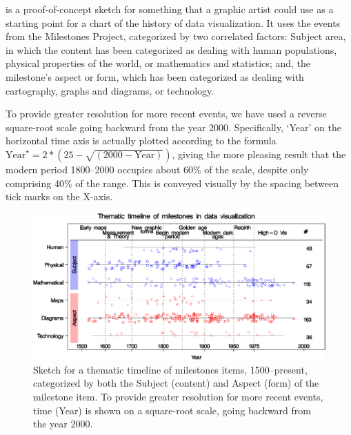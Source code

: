 is a proof-of-concept sketch for something that a graphic artist could use as a starting point for a chart of the history of data visualization. It uses the events from the Milestones Project, categorized by two correlated factors: Subject area, in which the content has been categorized as dealing with human populations, physical properties of the world, or mathematics and statistics; and, the milestone's aspect or form, which has been categorized as dealing with cartography, graphs and diagrams, or technology. 

To provide greater resolution for more recent events, we have used a reverse square-root scale going backward from the year 2000. Specifically, `Year' on the horizontal time axis is actually plotted according to the formula $\textrm{Year}^\star = 2* (25 - \sqrt{(2000 - \textrm{Year})})$, giving the more pleasing result that the modern period 1800--2000 occupies about 60\% of the scale, despite only comprising 40\% of the range.  This is conveyed visually by the spacing between tick marks on the X-axis.

\begin{figure}[!htb]
  \centering
  \includegraphics[width=\textwidth,clip]{fig/milecatline}
  \caption{Sketch for a thematic timeline of milestones items, 1500--present, categorized by both the Subject (content) and Aspect (form) of the milestone item.  To provide greater resolution for more recent events, time (Year) is shown on a square-root scale, going backward from the year 2000.}
  \label{fig:milecatline}
\end{figure}